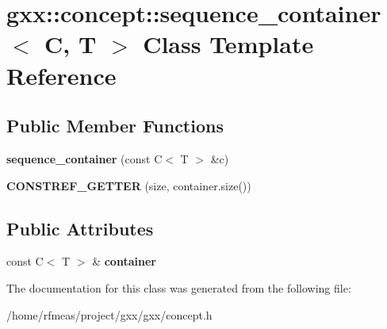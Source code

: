 \hypertarget{classgxx_1_1concept_1_1sequence__container}{}\section{gxx\+:\+:concept\+:\+:sequence\+\_\+container$<$ C, T $>$ Class Template Reference}
\label{classgxx_1_1concept_1_1sequence__container}
\subsection*{Public Member Functions}
\begin{DoxyCompactItemize}
\item 
{\bfseries sequence\+\_\+container} (const C$<$ T $>$ \&c)\hypertarget{classgxx_1_1concept_1_1sequence__container_adc8ebd5033b4fd88bc3f9d3f69c39978}{}\label{classgxx_1_1concept_1_1sequence__container_adc8ebd5033b4fd88bc3f9d3f69c39978}

\item 
{\bfseries C\+O\+N\+S\+T\+R\+E\+F\+\_\+\+G\+E\+T\+T\+ER} (size, container.\+size())\hypertarget{classgxx_1_1concept_1_1sequence__container_adf466f8a1b6edd67c535192af3bc9a4b}{}\label{classgxx_1_1concept_1_1sequence__container_adf466f8a1b6edd67c535192af3bc9a4b}

\end{DoxyCompactItemize}
\subsection*{Public Attributes}
\begin{DoxyCompactItemize}
\item 
const C$<$ T $>$ \& {\bfseries container}\hypertarget{classgxx_1_1concept_1_1sequence__container_a64cef2139337c3b5d7d965ec0f633e0f}{}\label{classgxx_1_1concept_1_1sequence__container_a64cef2139337c3b5d7d965ec0f633e0f}

\end{DoxyCompactItemize}


The documentation for this class was generated from the following file\+:\begin{DoxyCompactItemize}
\item 
/home/rfmeas/project/gxx/gxx/concept.\+h\end{DoxyCompactItemize}
